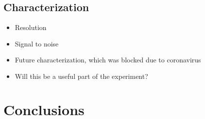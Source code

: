 \documentclass[12pt]{puthesis}
\begin{document}
\section{Characterization}
\begin{itemize}
\item Resolution

\item Signal to noise 

\item Future characterization, which was blocked due to coronavirus 

\item Will this be a useful part of the experiment?
\end{itemize}



\chapter{Conclusions}





\singlespacing

\cleardoublepage
\ifdefined{}
\else
\fi
{}

\end{document}
